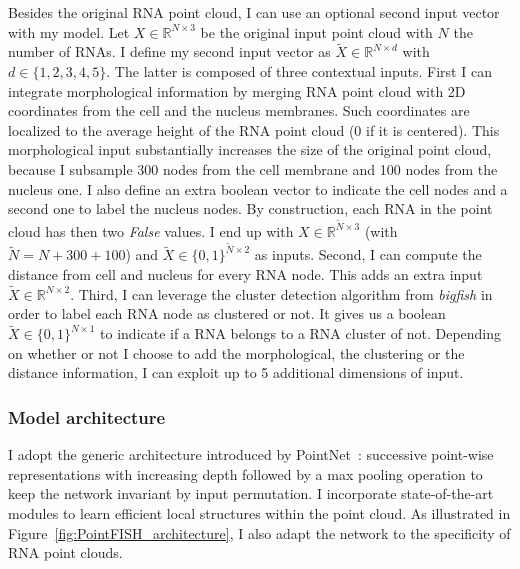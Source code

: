 Besides the original \ac{RNA} point cloud, I can use an optional second input vector with my model.
Let $X \in \mathbb{R}^{N \times 3}$ be the original input point cloud with $N$ the number of \ac{RNA}s.
I define my second input vector as $\tilde{X} \in \mathbb{R}^{N \times d}$ with $d \in \{1, 2, 3, 4, 5\}$.
The latter is composed of three contextual inputs.
First I can integrate morphological information by merging \ac{RNA} point cloud with 2D coordinates from the cell and the nucleus membranes.
Such coordinates are localized to the average height of the \ac{RNA} point cloud (0 if it is centered).
This morphological input substantially increases the size of the original point cloud, because I subsample 300 nodes from the cell membrane and 100 nodes from the nucleus one.
I also define an extra boolean vector to indicate the cell nodes and a second one to label the nucleus nodes.
By construction, each \ac{RNA} in the point cloud has then two \emph{False} values.
I end up with $X \in \mathbb{R}^{\tilde{N} \times 3}$ (with $\tilde{N} = N + 300 + 100$) and $\tilde{X} \in \{0, 1\}^{\tilde{N} \times 2}$ as inputs.
Second, I can compute the distance from cell and nucleus for every \ac{RNA} node.
This adds an extra input $\tilde{X} \in \mathbb{R}^{N \times 2}$.
Third, I can leverage the cluster detection algorithm from \emph{bigfish} in order to label each \ac{RNA} node as clustered or not.
It gives us a boolean $\tilde{X} \in \{0, 1\}^{N \times 1}$ to indicate if a RNA belongs to a RNA cluster of not.
Depending on whether or not I choose to add the morphological, the clustering or the distance information, I can exploit up to 5 additional dimensions of input.

\subsubsection{Model architecture}

I adopt the generic architecture introduced by PointNet~\cite{Qi_2017_CVPR}: successive point-wise representations with increasing depth followed by a max pooling operation to keep the network invariant by input permutation.
I incorporate state-of-the-art modules to learn efficient local structures within the point cloud.
As illustrated in Figure~\ref{fig:PointFISH_architecture}, I also adapt the network to the specificity of RNA point clouds.

